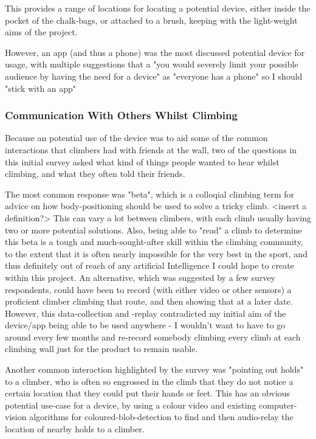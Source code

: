 This provides a range of locations for locating a potential device, either inside the pocket of the chalk-bags, or attached to a brush, keeping with the light-weight aims of the project.

However, an app (and thus a phone) was the most discussed potential device for usage, with multiple suggestions that a "you would severely limit your possible audience by having the need for a device" as "everyone has a phone" so I should "stick with an app"

\subsubsection{Communication With Others Whilst Climbing}
Because an potential use of the device was to aid some of the common interactions that climbers had with friends at the wall, two of the questions in this initial survey asked what kind of things people wanted to hear whilst climbing, and what they often told their friends.

The most common response was "beta", which is a colloqial climbing term for advice on how body-positioning should be used to solve a tricky climb. 
<insert a definition?>
This can vary a lot between climbers, with each climb usually having two or more potential solutions.
Also, being able to "read" a climb to determine this beta is a tough and much-sought-after skill within the climbing community, to the extent that it is often nearly impossible for the very best in the sport, and thus definitely out of reach of any artificial Intelligence I could hope to create within this project.
An alternative, which was suggested by a few survey respondents, could have been to record (with either video or other sensors) a proficient climber climbing that route, and then showing that at a later date. 
However, this data-collection and -replay contradicted my initial aim of the device/app being able to be used anywhere - I wouldn't want to have to go around every few months and re-record somebody climbing every climb at each climbing wall just for the product to remain usable.

Another common interaction highlighted by the survey was "pointing out holds" to a climber, who is often so engrossed in the climb that they do not notice a certain location that they could put their hands or feet. This has an obvious potential use-case for a device, by using a colour video and existing computer-vision algorithms for coloured-blob-detection to find and then audio-relay the location of nearby holds to a climber.



